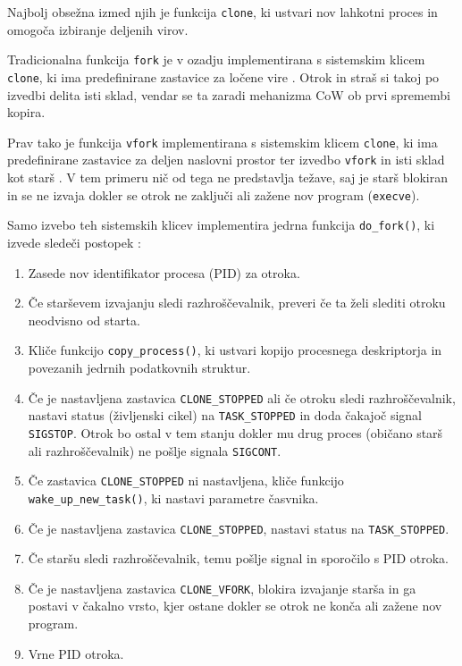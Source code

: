\documentclass[a4paper,12pt,openright]{book}
\begin{document}
Najbolj obsežna izmed njih je funkcija \texttt{clone}, ki ustvari nov lahkotni proces in omogoča izbiranje deljenih virov.

Tradicionalna funkcija \texttt{fork} je v ozadju implementirana s sistemskim klicem \texttt{clone}, ki ima predefinirane zastavice za ločene vire \cite{Bovet_Cesati_2005}.
Otrok in straš si takoj po izvedbi delita isti sklad, vendar se ta zaradi mehanizma CoW ob prvi spremembi kopira.

Prav tako je funkcija \texttt{vfork} implementirana s sistemskim klicem \texttt{clone}, ki ima predefinirane zastavice za deljen naslovni prostor ter izvedbo \texttt{vfork} in isti sklad kot starš \cite{Bovet_Cesati_2005}.
V tem primeru nič od tega ne predstavlja težave, saj je starš blokiran in se ne izvaja dokler se otrok ne zaključi ali zažene nov program (\texttt{execve}).

Samo izvebo teh sistemskih klicev implementira jedrna funkcija \texttt{do\_fork()}, ki izvede sledeči postopek \cite{Bovet_Cesati_2005}:
\begin{enumerate}
	\item Zasede nov identifikator procesa (PID) za otroka.
	\item Če starševem izvajanju sledi razhroščevalnik, preveri če ta želi slediti otroku neodvisno od starta.
	\item Kliče funkcijo \texttt{copy\_process()}, ki ustvari kopijo procesnega deskriptorja in povezanih jedrnih podatkovnih struktur.
	\item Če je nastavljena zastavica \texttt{CLONE\_STOPPED} ali če otroku sledi razhroščevalnik, nastavi status (življenski cikel) na \texttt{TASK\_STOPPED} in doda čakajoč signal \texttt{SIGSTOP}.
	      Otrok bo ostal v tem stanju dokler mu drug proces (običano starš ali razhroščevalnik) ne pošlje signala \texttt{SIGCONT}.
	\item Če zastavica \texttt{CLONE\_STOPPED} ni nastavljena, kliče funkcijo \texttt{wake\_up\_new\-\_task()}, ki nastavi parametre časvnika.
	\item Če je nastavljena zastavica \texttt{CLONE\_STOPPED}, nastavi status na \texttt{TASK\-\_STOPPED}.
	\item Če staršu sledi razhroščevalnik, temu pošlje signal in sporočilo s PID otroka.
	\item Če je nastavljena zastavica \texttt{CLONE\_VFORK}, blokira izvajanje starša in ga postavi v čakalno vrsto, kjer ostane dokler se otrok ne konča ali zažene nov program.
	\item Vrne PID otroka.
\end{enumerate}
\end{document}
